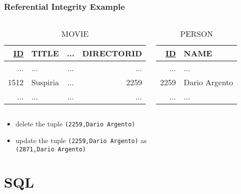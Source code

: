 \documentclass[dvipsnames]{beamer}
\theoremstyle{plain}
\begin{document}
\begin{frame}
  \frametitle{Referential Integrity Example}

  \begin{example}
    \begin{columns}
      \begin{tiny}
      \begin{table}
        \caption{MOVIE}
        \begin{tabular}{|r|l|c|r|}\hline
\underline{ID} & TITLE & ... & DIRECTORID\\\hline\hline
 ... & ...             & ... &        ...\\\hline
1512 & Suspiria        & ... &       2259\\\hline
 ... & ...             & ... &        ...\\\hline
        \end{tabular}
      \end{table}
      \end{tiny}

      \begin{tiny}
      \begin{table}
        \caption{PERSON}
        \begin{tabular}{|r|l|}\hline
\underline{ID} & NAME\\\hline\hline
 ... & ...           \\\hline
2259 & Dario Argento \\\hline
 ... & ...           \\\hline
        \end{tabular}
      \end{table}
      \end{tiny}
    \end{columns}

    \pause
    \begin{itemize}
      \item delete the tuple \texttt{(2259,Dario Argento)}
      \item update the tuple \texttt{(2259,Dario Argento)} as\\
        \texttt{(2871,Dario Argento)}
    \end{itemize}
  \end{example}
\end{frame}

\lstset{language=FullSQL}

\section{SQL}
\end{document}
